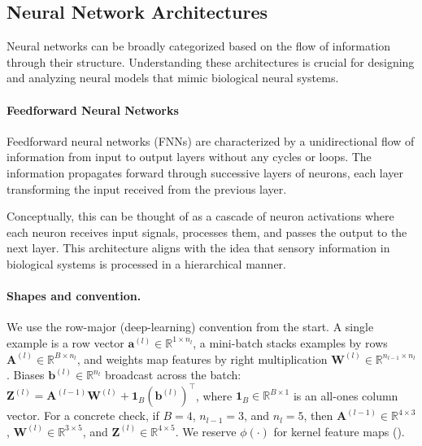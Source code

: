 
\subsection{Neural Network Architectures}
\label{sec:perceptron_neural_network_architectures}

Neural networks can be broadly categorized based on the flow of information through their structure. Understanding these architectures is crucial for designing and analyzing neural models that mimic biological neural systems.

\paragraph{Feedforward Neural Networks}

Feedforward neural networks (FNNs) are characterized by a unidirectional flow of information from input to output layers without any cycles or loops. The information propagates forward through successive layers of neurons, each layer transforming the input received from the previous layer.

Conceptually, this can be thought of as a cascade of neuron activations where each neuron receives input signals, processes them, and passes the output to the next layer. This architecture aligns with the idea that sensory information in biological systems is processed in a hierarchical manner.

\paragraph{Shapes and convention.} We use the row-major (deep-learning) convention from the start. A single example is a row vector \(\mathbf{a}^{(l)}\in\mathbb{R}^{1\times n_l}\), a mini\hyp{}batch stacks examples by rows \(\mathbf{A}^{(l)}\in\mathbb{R}^{B\times n_l}\), and weights map features by right multiplication \(\mathbf{W}^{(l)}\in\mathbb{R}^{n_{l-1}\times n_l}\). Biases \(\mathbf{b}^{(l)}\in\mathbb{R}^{n_l}\) broadcast across the batch: \(\mathbf{Z}^{(l)}=\mathbf{A}^{(l-1)}\mathbf{W}^{(l)}+\mathbf{1}_B(\mathbf{b}^{(l)})^\top\), where \(\mathbf{1}_B\in\mathbb{R}^{B\times 1}\) is an all-ones column vector. For a concrete check, if \(B=4\), \(n_{l-1}=3\), and \(n_l=5\), then \(\mathbf{A}^{(l-1)}\in\mathbb{R}^{4\times 3}\), \(\mathbf{W}^{(l)}\in\mathbb{R}^{3\times 5}\), and \(\mathbf{Z}^{(l)}\in\mathbb{R}^{4\times 5}\). We reserve \(\phi(\cdot)\) for kernel feature maps ().

